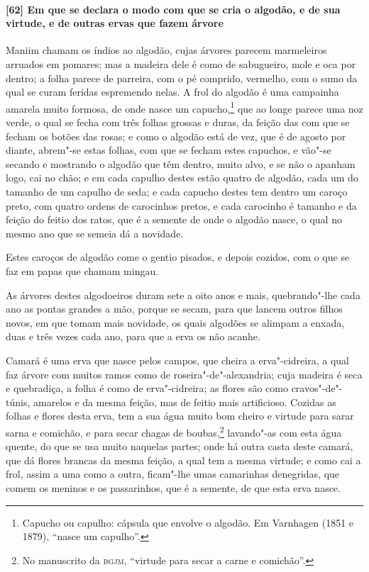 \paragraph{[62] Em que se declara o modo com que se cria o algodão, e de sua virtude, e de
outras ervas que fazem árvore}\quad
Maniim chamam os índios ao algodão, cujas árvores parecem marmeleiros arruados em pomares;
mas a madeira dele é como de sabugueiro, mole e oca por dentro; a folha parece de
parreira, com o pé comprido, vermelho, com o sumo da qual se curam feridas espremendo
nelas. A frol do algodão é uma campainha amarela muito formosa, de onde nasce um
capucho,\footnote{ Capucho ou capulho: cápsula que envolve o algodão. 
Em Varnhagen (1851 e 1879), ``nasce um capulho''.} que ao longe parece
uma noz verde, o qual se fecha com três folhas grossas e duras, da feição das com que se
fecham os botões das rosas; e como o algodão está de vez, que é de agosto por diante,
abrem"-se estas folhas, com que se fecham estes capuchos, e vão"-se secando e mostrando o
algodão que têm dentro, muito alvo, e se não o apanham logo, cai no chão; e em cada
capulho destes estão quatro de algodão, cada um do tamanho de um capulho de seda; e cada
capucho destes tem dentro um caroço preto, com quatro ordens de carocinhos pretos, e cada
carocinho é tamanho e da feição do feitio dos ratos, que é a semente de onde o algodão
nasce, o qual no mesmo ano que se semeia dá a novidade.

Estes caroços de algodão come o gentio pisados, e depois cozidos, com o que se faz em
papas que chamam mingau.

As árvores destes algodoeiros duram sete a oito anos e mais, quebrando"-lhe cada ano as
pontas grandes a mão, porque se secam, para que lancem outros filhos novos, em que tomam
mais novidade, os quais algodões se alimpam a enxada, duas e três vezes cada ano, para que
a erva os não acanhe.

Camará é uma erva que nasce pelos campos, que cheira a erva"-cidreira, a qual faz árvore
com muitos ramos como de roseira"-de"-alexandria; cuja madeira é seca e quebradiça, a folha
é como de erva"-cidreira; as flores são como cravos"-de"-túnis, amarelos e da mesma feição,
mas de feitio mais artificioso. Cozidas as folhas e flores desta erva, tem a sua água
muito bom cheiro e virtude para sarar sarna e comichão, e para secar chagas de
boubas,\footnote{ No manuscrito da \textsc{bgjm}, ``virtude para secar a carne e
comichão''.} lavando"-as com esta água quente, do que se usa muito naquelas partes; onde há
outra casta deste camará, que dá flores brancas da mesma feição, a qual tem a mesma
virtude; e como cai a frol, assim a uma como a outra, ficam"-lhe umas camarinhas
denegridas, que comem os meninos e os passarinhos, que é a semente, de que esta erva
nasce.

